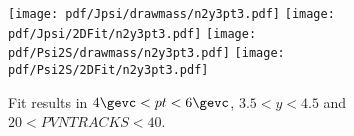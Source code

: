 \begin{figure}[H]
\begin{center}
\texttt{[image: pdf/Jpsi/drawmass/n2y3pt3.pdf]}
\texttt{[image: pdf/Jpsi/2DFit/n2y3pt3.pdf]}
\vspace*{-0.5cm}
\texttt{[image: pdf/Psi2S/drawmass/n2y3pt3.pdf]}
\texttt{[image: pdf/Psi2S/2DFit/n2y3pt3.pdf]}
\vspace*{-0.5cm}
\end{center}
\caption{Fit results in $4\gevc<pt<6\gevc$, $3.5<y<4.5$ and $20<PVNTRACKS<40$.}
\label{Fitn2y3pt3}
\end{figure}
